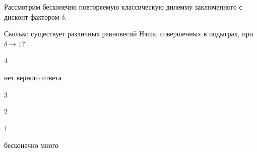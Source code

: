 
\begin{question}
Рассмотрим бесконечно повторяемую классическую дилемму заключенного с дисконт-фактором \(\delta\).

Сколько существует различных равновесий Нэша, совершенных в подыграх, при \(\delta \to 1\)?
\begin{answerlist}
  \item 4
  \item нет верного ответа
  \item 3
  \item 2
  \item 1
  \item бесконечно много
\end{answerlist}
\end{question}


